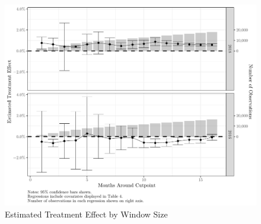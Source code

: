 \documentclass[
  12pt,
]{article}
\begin{document}
\newpage
\begin{figure}[H]

{\centering \includegraphics{rewrite_files/figure-latex/sensitivity-1} 

}

\caption{\label{fig:sens}Estimated Treatment Effect by Window Size}\label{fig:sensitivity}
\end{figure}
\end{document}
